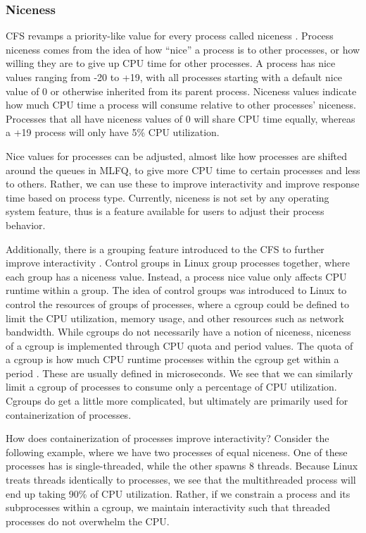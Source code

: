 \documentclass[12pt]{article}
\def\ind{\hspace*{0.3in}}
\begin{document}
\subsubsection*{Niceness}

\ind CFS revamps a priority-like value for every process called niceness \cite{InfluenceSchedulingPriority2006}. Process niceness comes from the idea of how ``nice'' a process is to other processes, or how willing they are to give up CPU time for other processes. A process has nice values ranging from -20 to +19, with all processes starting with a default nice value of 0 or otherwise inherited from its parent process. Niceness values indicate how much CPU time a process will consume relative to other processes' niceness. Processes that all have niceness values of 0 will share CPU time equally, whereas a +19 process will only have 5\% CPU utilization. 

Nice values for processes can be adjusted, almost like how processes are shifted around the queues in MLFQ, to give more CPU time to certain processes and less to others. Rather, we can use these to improve interactivity and improve response time based on process type. Currently, niceness is not set by any operating system feature, thus is a feature available for users to adjust their process behavior. 

Additionally, there is a grouping feature introduced to the CFS to further improve interactivity \cite{heoControlGroupV22015,ControlGroupsLinux}. Control groups in Linux group processes together, where each group has a niceness value. Instead, a process nice value only affects CPU runtime within a group. The idea of control groups was introduced to Linux to control the resources of groups of processes, where a cgroup could be defined to limit the CPU utilization, memory usage, and other resources such as network bandwidth. While cgroups do not necessarily have a notion of niceness, niceness of a cgroup is implemented through CPU quota and period values. The quota of a cgroup is how much CPU runtime processes within the cgroup get within a period \cite{seltzerUnderstandingCgroups2018}. These are usually defined in microseconds. We see that we can similarly limit a cgroup of processes to consume only a percentage of CPU utilization. Cgroups do get a little more complicated, but ultimately are primarily used for containerization of processes.

How does containerization of processes improve interactivity? Consider the following example, where we have two processes of equal niceness. One of these processes has is single-threaded, while the other spawns 8 threads. Because Linux treats threads identically to processes, we see that the multithreaded process will end up taking 90\% of CPU utilization. Rather, if we constrain a process and its subprocesses within a cgroup, we maintain interactivity such that threaded processes do not overwhelm the CPU.
\end{document}
